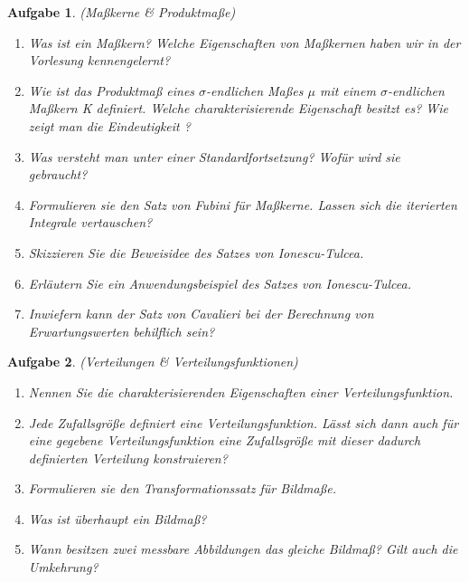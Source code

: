 \documentclass[11pt, a4paper, ngerman]{article}
\newtheorem{aufgabe}{Aufgabe}
\begin{document}
\begin{aufgabe} (Maßkerne \& Produktmaße)
    \begin{enumerate}
        \item 
        Was ist ein Maßkern? Welche Eigenschaften von Maßkernen haben wir in der Vorlesung kennengelernt? 
        \item
        Wie ist das Produktmaß eines $\sigma$-endlichen Maßes $\mu$ mit einem  $\sigma$-endlichen Maßkern K definiert. Welche charakterisierende Eigenschaft besitzt es?
        Wie zeigt man die Eindeutigkeit ? 
        \item 
        Was versteht man unter einer Standardfortsetzung? Wofür wird sie gebraucht?
        \item 
        Formulieren sie den Satz von Fubini für Maßkerne. Lassen sich die iterierten Integrale vertauschen? 
        \item
        Skizzieren Sie die Beweisidee des Satzes von Ionescu-Tulcea. 
        \item 
        Erläutern Sie ein Anwendungsbeispiel des Satzes von Ionescu-Tulcea. 
        \item 
        Inwiefern kann der Satz von Cavalieri bei der Berechnung von Erwartungswerten behilflich sein? 
    \end{enumerate}
\end{aufgabe}

\begin{aufgabe} (Verteilungen \& Verteilungsfunktionen)
    \begin{enumerate}
        \item 
        Nennen Sie die charakterisierenden Eigenschaften einer Verteilungsfunktion. 
        \item 
        Jede Zufallsgröße definiert eine Verteilungsfunktion. Lässt sich dann auch für eine gegebene Verteilungsfunktion eine Zufallsgröße mit dieser dadurch definierten Verteilung konstruieren? 
        \item 
        Formulieren sie den Transformationssatz für Bildmaße. 
        \item 
        Was ist überhaupt ein Bildmaß?
        \item 
        Wann besitzen zwei messbare Abbildungen das gleiche Bildmaß? Gilt auch die Umkehrung? 
    \end{enumerate}
\end{aufgabe}
\end{document}
